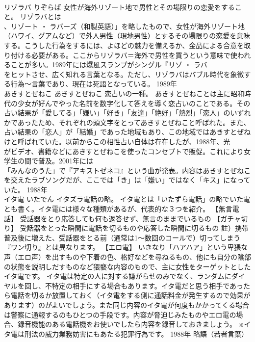 \documentclass[8pt]{extreport}
\begin{document}
\begin{CJK}{UTF8}{min}
\\	リゾラバ	りぞらば	女性が海外リゾート地で男性とその場限りの恋愛をすること。	リゾラバとは
\\	、リゾート ・ ラバーズ（和製英語）」を略したもので、女性が海外リゾート地（ハワイ、グアムなど）で外人男性（現地男性）とするその場限りの恋愛を意味する。こうした行為をするには、よほどの魅力を備えるか、金品による合意を取り付ける必要がある。ここからリゾラバ＝海外で男性を買うという意味で使われることが多い。1989年には爆風スランプがシングル『リゾ ・ ラバ 
\\	をヒットさせ、広く知れる言葉となる。ただし、リゾラバはバブル時代を象徴する行為～言葉であり、現在は死語となっている。	1989年	
\\	あきすとぜねこ	あきすとぜねこ	恋占いの一種。	あきすとぜねことは主に昭和時代の少女が好んでやった名前を数字化して答えを導く恋占いのことである。その占い結果が「愛してる」「嫌い」「好き」「友達」「絶好」「熱烈」「恋人」のいずれかであったため、それぞれの頭文字をとってあきすとぜねこと呼ばれた。また、占い結果の「恋人」が「結婚」であった地域もあり、この地域ではあきすとぜねけと呼ばれていた。以前からこの相性占い自体は存在したが、1988年、光
\\	がビデオ、書籍などにあきすとぜねこを使ったコンセプトで販促。これにより女学生の間で普及。2001年には
\\	「みんなのうた」で『アキストゼネコ』という曲が発表。内容はあきすとぜねこを交えたラブソングだが、ここでは「き」は「嫌い」ではなく「キス」になっていた。	1988年	
\\	イタ電	いたでん	イタズラ電話の略。	イタ電とは「いたずら電話」の略でいた電とも書く。イタ電には様々な種類があるが、代表的な３つを紹介。 【無言電話】 受話器をとり応答しても何も返答せず、無言のままでいるもの 【ガチャ切り】 受話器をとった瞬間に電話を切るものや応答した瞬間に切るもの 註）携帯普及後に増えた、受話器をとる前（通常は1～数回のコールで）切ってしまう『ワン切り』とは異なります。 【エロ電】 いきなり「ハアハア」という卑猥な声（エロ声）を出すものや下着の色、格好などを尋ねるもの、他にも自分の陰部の状態を説明しだすものなど猥褻な内容のもので、主に女性をターゲットとしたイタ電です。 イタ電は特定の人に対する嫌がらせのみでなく、ランダムにダイヤルを回し、不特定の相手にする場合もあります。イタ電だと思う相手であったら電話を切るか放置しておく（イタ電をする側に通話料金が発生するので効果があります）のがよいでしょう。また同じ内容のイタ電が何度もかかってくる場合は警察に通報するのもひとつの手段です。内容が脅迫じみたものやエロ電の場合、録音機能のある電話機をお使いでしたら内容を録音しておきましょう。 ※イタ電は刑法の威力業務妨害にもあたる犯罪行為です。	1988年	略語（若者言葉）	

\end{CJK}
\end{document}
